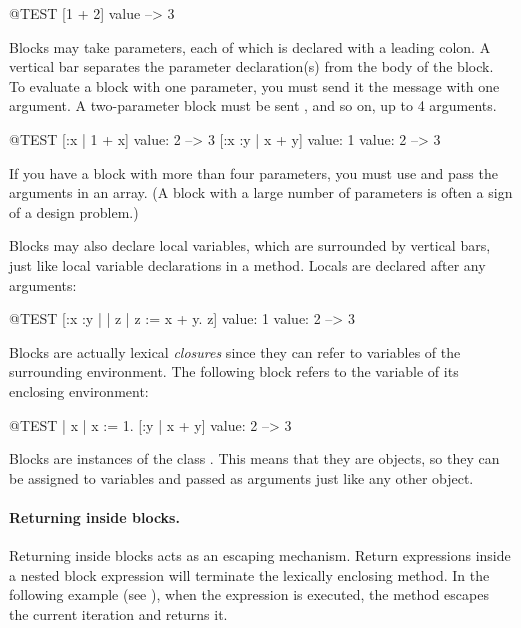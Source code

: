 \documentclass[a4paper,10pt,twoside]{book}
\begin{document}
\begin{code}{@TEST}
[1 + 2] value --> 3
\end{code}

Blocks may take parameters, each of which is declared with a leading colon.
A  vertical bar separates the parameter declaration(s) from the body of the block.
To evaluate a block with one parameter, you must send it the message  with one argument.
A two-parameter block must be sent , and so on, up to 4 arguments.

\begin{code}{@TEST}
[:x | 1 + x] value: 2 --> 3
[:x :y | x + y] value: 1 value: 2 --> 3
\end{code}

If you have a block with more than four parameters, you must use  and pass the arguments in an array.
(A block with a large number of parameters is often a sign of a design problem.)

Blocks may also declare local variables, which are surrounded by vertical bars, just like local variable declarations in a method.
Locals are declared after any arguments:

\begin{code}{@TEST}
[:x :y | | z | z := x + y. z] value: 1 value: 2 --> 3
\end{code}

Blocks are actually lexical \emph{closures} since they can refer to variables of the surrounding environment.
The following block refers to the variable  of its enclosing environment:

\begin{code}{@TEST}
| x |
x := 1.
[:y | x + y] value: 2 --> 3
\end{code}

Blocks are instances of the class .
This means that they are objects, so they can be assigned to variables and passed as arguments just like any other object.

\paragraph{Returning inside blocks.}
Returning inside blocks acts as an escaping mechanism.
Return expressions inside a nested block expression will terminate the lexically enclosing method.
In the following example (see ), when the expression  is executed, the method  escapes the current iteration and returns it.
\end{document}
